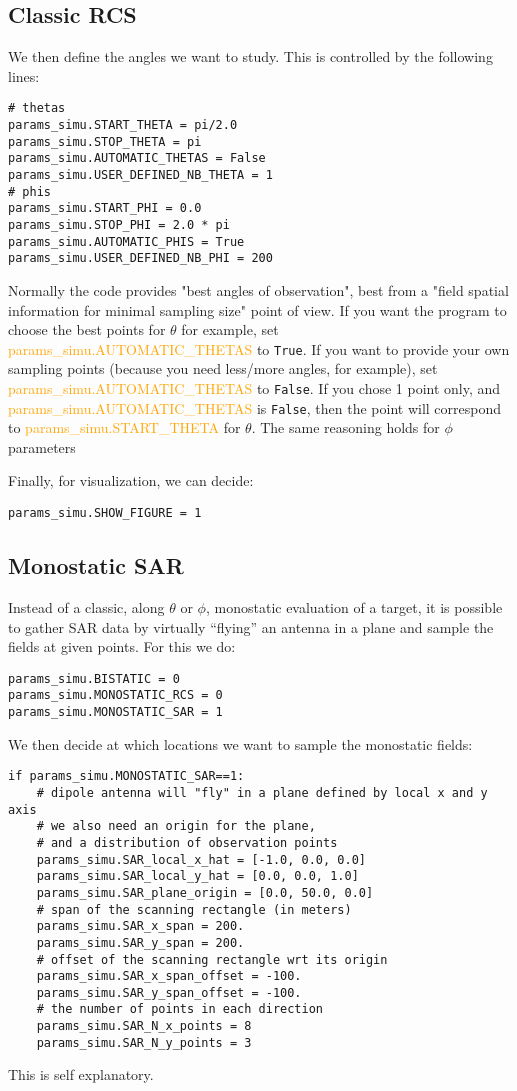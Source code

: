 \documentclass[a4paper,10pt]{book}
\newcommand{\parameter}[1] {\textcolor{orange}{\textsf{#1}}}
\begin{document}
\subsection{Classic RCS}
%
\par
We then define the angles we want to study. This is controlled by the following lines:
\begin{verbatim}
# thetas
params_simu.START_THETA = pi/2.0
params_simu.STOP_THETA = pi
params_simu.AUTOMATIC_THETAS = False
params_simu.USER_DEFINED_NB_THETA = 1
# phis
params_simu.START_PHI = 0.0
params_simu.STOP_PHI = 2.0 * pi
params_simu.AUTOMATIC_PHIS = True
params_simu.USER_DEFINED_NB_PHI = 200
\end{verbatim}
%
\par
Normally the code provides "best angles of observation", best from a "field spatial information for minimal sampling size" point of view. If you want the program to choose the best points for $\theta$ for example, set \parameter{params\_simu.AUTOMATIC\_THETAS} to \texttt{True}. If you want to provide your own sampling points (because you need less/more angles, for example), set \parameter{params\_simu.AUTOMATIC\_THETAS} to \texttt{False}. If you chose 1 point only, and \parameter{params\_simu.AUTOMATIC\_THETAS} is \texttt{False}, then the point will correspond to \parameter{params\_simu.START\_THETA} for $\theta$. The same reasoning holds for $\phi$ parameters
%
\par
Finally, for visualization, we can decide:
\begin{verbatim}
params_simu.SHOW_FIGURE = 1
\end{verbatim}

\subsection{Monostatic SAR}
%
\par
Instead of a classic, along $\theta$ or $\phi$, monostatic evaluation of a target, it is possible to gather SAR data by virtually ``flying'' an antenna in a plane and sample the fields at given points. For this we do:
\begin{verbatim}
params_simu.BISTATIC = 0
params_simu.MONOSTATIC_RCS = 0
params_simu.MONOSTATIC_SAR = 1
\end{verbatim}
%
\par
We then decide at which locations we want to sample the monostatic fields:
\begin{verbatim}
if params_simu.MONOSTATIC_SAR==1:
    # dipole antenna will "fly" in a plane defined by local x and y axis
    # we also need an origin for the plane, 
    # and a distribution of observation points
    params_simu.SAR_local_x_hat = [-1.0, 0.0, 0.0]
    params_simu.SAR_local_y_hat = [0.0, 0.0, 1.0]
    params_simu.SAR_plane_origin = [0.0, 50.0, 0.0]
    # span of the scanning rectangle (in meters)
    params_simu.SAR_x_span = 200.
    params_simu.SAR_y_span = 200.
    # offset of the scanning rectangle wrt its origin
    params_simu.SAR_x_span_offset = -100.
    params_simu.SAR_y_span_offset = -100.
    # the number of points in each direction
    params_simu.SAR_N_x_points = 8
    params_simu.SAR_N_y_points = 3
\end{verbatim}
This is self explanatory. 
\end{document}
